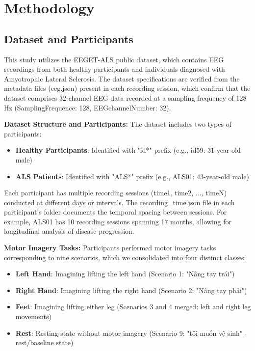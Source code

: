 \documentclass[conference]{IEEEtran}
\begin{document}
\section{Methodology}

\subsection{Dataset and Participants}

This study utilizes the EEGET-ALS public dataset, which contains EEG recordings from both healthy participants and individuals diagnosed with Amyotrophic Lateral Sclerosis. The dataset specifications are verified from the metadata files (eeg.json) present in each recording session, which confirm that the dataset comprises 32-channel EEG data recorded at a sampling frequency of 128 Hz (SamplingFrequence: 128, EEGchannelNumber: 32).

\textbf{Dataset Structure and Participants:}
The dataset includes two types of participants:
\begin{itemize}
    \item \textbf{Healthy Participants}: Identified with "id*" prefix (e.g., id59: 31-year-old male)
    \item \textbf{ALS Patients}: Identified with "ALS*" prefix (e.g., ALS01: 43-year-old male)
\end{itemize}

Each participant has multiple recording sessions (time1, time2, ..., timeN) conducted at different days or intervals. The recording\_time.json file in each participant's folder documents the temporal spacing between sessions. For example, ALS01 has 10 recording sessions spanning 17 months, allowing for longitudinal analysis of disease progression.

\textbf{Motor Imagery Tasks:}
Participants performed motor imagery tasks corresponding to nine scenarios, which we consolidated into four distinct classes:

\begin{itemize}
    \item \textbf{Left Hand}: Imagining lifting the left hand (Scenario 1: "Nâng tay trái")
    \item \textbf{Right Hand}: Imagining lifting the right hand (Scenario 2: "Nâng tay phải")
    \item \textbf{Feet}: Imagining lifting either leg (Scenarios 3 and 4 merged: left and right leg movements)
    \item \textbf{Rest}: Resting state without motor imagery (Scenario 9: "tôi muốn vệ sinh" - rest/baseline state)
\end{itemize}
\end{document}
